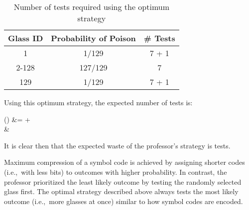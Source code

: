 \begin{table}[h]
  \centering
  \begin{tabular}{c|c|c}
    \hline
    Glass ID & Probability of Poison & \# Tests  \\\hline
    1        & 1/129                 & 7 + 1     \\\hline
    2-128    & 127/129               & 7         \\\hline
    129      & 1/129                 & 7 + 1     \\\hline
  \end{tabular}
  \caption{Number of tests required using the optimum strategy}\label{tab:problem5.9.20-Opt}
\end{table}

\noindent
Using this optimum strategy, the expected number of tests is:

\begin{aligncustom}
  () &=   +   \\
  &\approx {}
\end{aligncustom}

It is clear then that the expected waste of the professor's strategy is  tests.

Maximum compression of a symbol code is achieved by assigning shorter codes (i.e.,~with less bits) to outcomes with higher probability.  In contrast, the professor prioritized the least likely outcome by testing the randomly selected glass first.  The optimal strategy described above always tests the most likely outcome (i.e.,~more glasses at once) similar to how symbol codes are encoded.